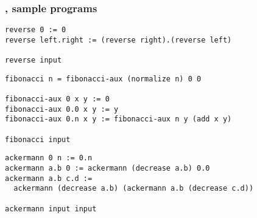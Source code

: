 \begin{frame}[fragile]

\frametitle{\D{}, sample programs}

\begin{lstlisting}
reverse 0 := 0
reverse left.right := (reverse right).(reverse left)

reverse input
\end{lstlisting}

\begin{lstlisting}
fibonacci n = fibonacci-aux (normalize n) 0 0

fibonacci-aux 0 x y := 0
fibonacci-aux 0.0 x y := y
fibonacci-aux 0.n x y := fibonacci-aux n y (add x y)

fibonacci input
\end{lstlisting}

\begin{lstlisting}
ackermann 0 n := 0.n
ackermann a.b 0 := ackermann (decrease a.b) 0.0
ackermann a.b c.d :=
  ackermann (decrease a.b) (ackermann a.b (decrease c.d))

ackermann input input
\end{lstlisting}

\end{frame}
